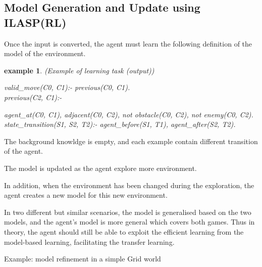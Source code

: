 \documentclass[12pt,twoside]{report}
\newtheorem{examp}{example}[section]
\begin{document}
\subsection{Model Generation and Update using ILASP(RL)}

Once the input is converted, the agent must learn the following definition of the model of the environment.

%

\begin{examp} \normalfont(Example of learning task (output))

valid\_move(C0, C1):- previous(C0, C1).
\\
previous(C2, C1):-

agent\_at(C0, C1),
adjacent(C0, C2),
not obstacle(C0, C2),
not enemy(C0, C2).
\\
state\_transition(S1, S2, T2):-
  agent\_before(S1, T1),
  agent\_after(S2, T2).

\end{examp}
\label{learning_task}

The background knowldge is empty, and each example contain different transition of the agent.

The model is updated as the agent explore more environment.

In addition, when the environment has been changed during the exploration, the agent creates a new model for this new environment.

In two different but similar scenarios, the model is generalised based on the two models, and the agent's model is more general which covers both games. Thus in theory, the agent should still be able to exploit the efficient learning from the model-based learning, facilitating the transfer learning.


Example: model refinement in a simple Grid world
\end{document}
